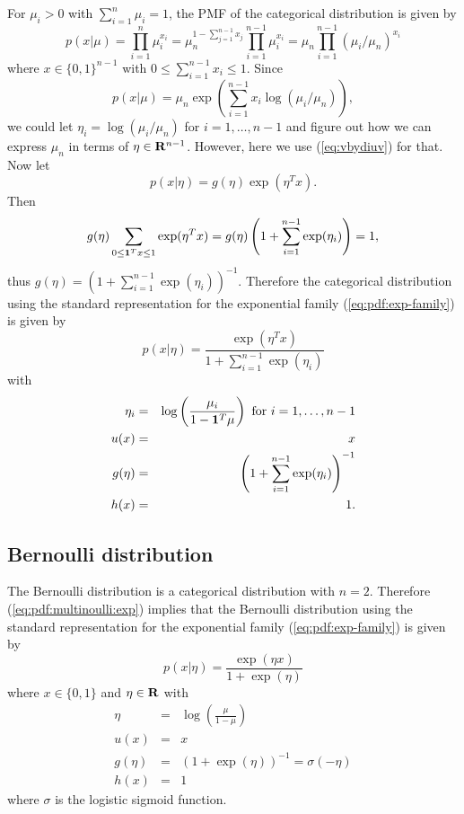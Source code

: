 For $\mu_i>0$ with $\sum_{i=1}^n \mu_i =1$,
the PMF of the categorical distribution
is given by
\begin{equation}
p(x|\mu) = \prod_{i=1}^n \mu_i^{x_i}
= \mu_n^{1-\sum_{j=1}^{n-1} x_j}\prod_{i=1}^{n-1} \mu_i^{x_i}
= \mu_n \prod_{i=1}^{n-1} (\mu_i / \mu_n)^{x_i}
\end{equation}
where $x \in \{0,1\}^{n-1}$ with $0\leq \sum_{i=1}^{n-1} x_i \leq 1$.
Since
\begin{equation}
p(x|\mu) = \mu_n \exp\left( \sum_{i=1}^{n-1} x_i \log(\mu_i / \mu_n) \right),
\end{equation}
we could let $\eta_i = \log(\mu_i / \mu_n)$ for $i=1, \ldots, n-1$
and figure out how we can express $\mu_n$ in terms of $\eta\in\mathbf{R}^{n-1}$.
However, here we use (\ref{eq:vbydiuv}) for that.
Now let
\begin{equation}
p(x|\eta) = g(\eta) \exp(\eta^Tx).
\end{equation}
Then
\begin{equation}
g(\eta) \sum_{0\leq \mathbf 1^T x \leq 1} \exp(\eta^T x) = g(\eta) \left( 1 + \sum_{i=1}^{n-1} \exp(\eta_i)\right) = 1,
\end{equation}
thus
$g(\eta) = \left( 1 + \sum_{i=1}^{n-1} \exp(\eta_i)\right)^{-1}$.
Therefore the categorical distribution using the standard representation for the exponential family (\ref{eq:pdf:exp-family})
is given by
\begin{equation}
\label{eq:pdf:multinoulli:exp}
p(x|\eta) = \frac{\exp(\eta^T x)}{1 + \sum_{i=1}^{n-1} \exp(\eta_i)}
\end{equation}
with
\begin{eqnarray}
\eta_i &=& \log\left(\frac{\mu_i}{1-\mathbf 1^T \mu} \right)
\mbox{ for } i=1,\ldots,n-1
\\
u(x) &=& x
\\
g(\eta) &=& \left( 1 + \sum_{i=1}^{n-1} \exp(\eta_i)\right)^{-1}
\\
h(x) &=& 1.
\end{eqnarray}

\subsection{Bernoulli distribution}

The Bernoulli distribution is a categorical distribution with $n=2$.
Therefore (\ref{eq:pdf:multinoulli:exp}) implies that
the Bernoulli distribution using the standard representation for the exponential family (\ref{eq:pdf:exp-family})
is given by
\begin{equation}
\label{eq:pdf:bernoulli:exp}
p(x|\eta) = \frac{\exp(\eta x)}{1 + \exp(\eta)}
\end{equation}
where $x \in \{0,1\}$ and $\eta \in \mathbf{R}$
with
\begin{eqnarray}
\eta &=& \log\left(\frac{\mu}{1-\mu} \right)
\\
u(x) &=& x
\\
g(\eta) &=& \left( 1 + \exp(\eta)\right)^{-1} = \sigma(-\eta)
\\
h(x) &=& 1
\end{eqnarray}
where $\sigma$ is the logistic sigmoid function.


